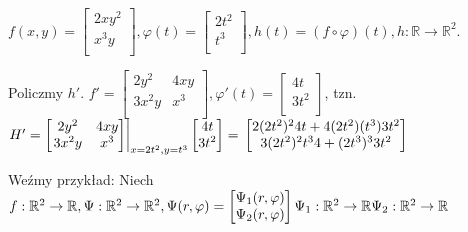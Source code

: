 \documentclass[../main.tex]{subfiles}
\begin{document}
\begin{przyklad}

\end{przyklad}
$f(x,y) = \left [ \begin{matrix}
2xy^2\\
x^3 y\\\end{matrix}\right ],
\varphi(t) = \left [ \begin{matrix}
2t^2\\
t^3\\
\end{matrix}\right ],
h(t) = (f \circ \varphi) (t), h: \mathbb{R}\to \mathbb{R}^2$.

\vspace{0.5cm}
Policzmy $h'$. $f' = \left [ \begin{matrix}
2y^2    &4xy\\
3x^2y   &x^3\\
\end{matrix}\right ], \varphi '(t) = \left [ \begin{matrix}
4t\\
3t^2\\
    \end{matrix}\right ]$, tzn. $H' = \left [ \left .\begin{matrix}
2y^2    &4xy\\
3x^2y   &x^3\\
    \end{matrix}\right ]\right |_{x=2t^2, y=t^3} \left [ \begin{matrix}
4t\\
3t^2\\
\end{matrix}\right ] = \\
\left [ \begin{matrix} 2(2t^2)^2 4t + 4(2t^2)(t^3) 3t^2\\
3(2t^2)^2 t^3 4 + (2t^3)^3 3t^2\\\end{matrix}\right ] $

Weźmy przykład:
Niech $f: \mathbb{R}^2 \to \mathbb{R}, \Psi: \mathbb{R}^2 \to \mathbb{R}^2, \Psi(r,\varphi) = \left [ \begin{matrix}
\Psi_1(r,\varphi)\\
\Psi_2(r,\varphi)\\\end{matrix}\right ]\\
\Psi_1: \mathbb{R}^2 \to \mathbb{R}\\
\Psi_2: \mathbb{R}^2 \to \mathbb{R}$
\end{document}
